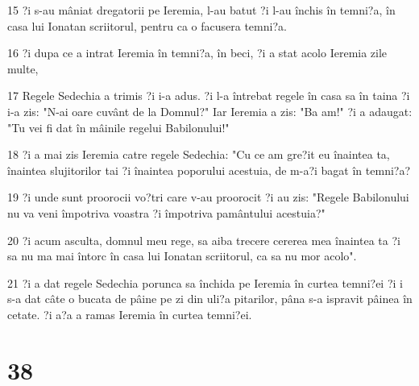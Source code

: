 \par 15 ?i s-au mâniat dregatorii pe Ieremia, l-au batut ?i l-au închis în temni?a, în casa lui Ionatan scriitorul, pentru ca o facusera temni?a.
\par 16 ?i dupa ce a intrat Ieremia în temni?a, în beci, ?i a stat acolo Ieremia zile multe,
\par 17 Regele Sedechia a trimis ?i i-a adus. ?i l-a întrebat regele în casa sa în taina ?i i-a zis: "N-ai oare cuvânt de la Domnul?" Iar Ieremia a zis: "Ba am!" ?i a adaugat: "Tu vei fi dat în mâinile regelui Babilonului!"
\par 18 ?i a mai zis Ieremia catre regele Sedechia: "Cu ce am gre?it eu înaintea ta, înaintea slujitorilor tai ?i înaintea poporului acestuia, de m-a?i bagat în temni?a?
\par 19 ?i unde sunt proorocii vo?tri care v-au proorocit ?i au zis: "Regele Babilonului nu va veni împotriva voastra ?i împotriva pamântului acestuia?"
\par 20 ?i acum asculta, domnul meu rege, sa aiba trecere cererea mea înaintea ta ?i sa nu ma mai întorc în casa lui Ionatan scriitorul, ca sa nu mor acolo".
\par 21 ?i a dat regele Sedechia porunca sa închida pe Ieremia în curtea temni?ei ?i i s-a dat câte o bucata de pâine pe zi din uli?a pitarilor, pâna s-a ispravit pâinea în cetate. ?i a?a a ramas Ieremia în curtea temni?ei.

\chapter{38}

